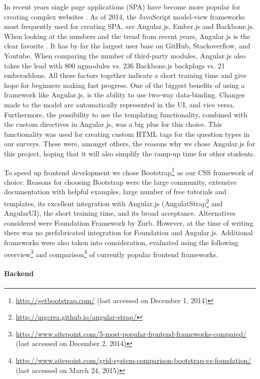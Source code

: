 		In recent years single page applications (SPA) have become more popular for creating complex websites \cite{Medium2013SPA, Tutsplus2013SPA}. As of 2014, the JavaScript model-view frameworks most frequently used for creating SPA, are Angular.js, Ember.js and Backbone.js. When looking at the numbers and the trend from recent years, Angular.js is the clear favorite \cite{AirPair2014MEAN}. It has by far the largest user base on GitHub, Stackoverflow, and Youtube. When comparing the number of third-party modules, Angular.js also takes the lead with 800 ngmodules vs. 236 Backbone.js backplugs vs. 21 emberaddons. All these factors together indicate a short training time and give hope for beginners making fast progress. One of the biggest benefits of using a framework like Angular.js, is the ability to use two-way data-binding. Changes made to the model are automatically represented in the UI, and vice versa. Furthermore, the possibility to use the templating functionality, combined with the custom directives in Angular.js, was a big plus for this choice. This functionality was used for creating custom HTML tags for the question types in our surveys. These were, amongst others, the reasons why we chose Angular.js for this project, hoping that it will also simplify the ramp-up time for other students.

		To speed up frontend development we chose Bootstrap\footnote{\url{http://getbootstrap.com/} (last accessed on December 1, 2014)} as our CSS framework of choice. Reasons for choosing Bootstrap were the large community, extensive documentation with helpful examples, large number of free tutorials and templates, its excellent integration with Angular.js (AngulatStrap\footnote{\url{http://mgcrea.github.io/angular-strap/}} and AngularUI), the short training time, and its broad acceptance.
		Alternatives considered were Foundation Framework by Zurb. However, at the time of writing there was no prefabricated integration for Foundation and Angular.js.
		Additional frameworks were also taken into consideration, evaluated using the following overview\footnote{\url{http://www.sitepoint.com/5-most-popular-frontend-frameworks-compared/} (last accessed on December 2, 2014)} and comparison\footnote{\url{http://www.sitepoint.com/grid-system-comparison-bootstrap-vs-foundation/} (last accessed on March 24, 2015)} of currently popular frontend frameworks.
	

	\paragraph{Backend}


